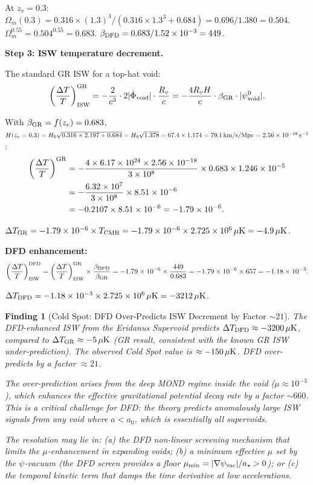 \documentclass[11pt]{article}
\newtheorem{finding}{Finding}
\newcommand{\ee}[1]{\times 10^{#1}}
\newcommand{\mufd}{\mu}
\newcommand{\DFD}{{\rm DFD}}
\begin{document}
At $z_v = 0.3$: $\Omega_m(0.3) = 0.316\times(1.3)^3/(0.316\times 1.3^3 + 0.684)
= 0.696/1.380 = 0.504$.
$\Omega_m^{0.55} = 0.504^{0.55} = 0.683$.
$\beta_\DFD = 0.683/1.52\ee{-3} = 449$.

\textbf{Step 3: ISW temperature decrement.}

The standard GR ISW for a top-hat void:
\begin{equation}
  \left(\frac{\Delta T}{T}\right)_{\rm ISW}^{\rm GR}
  = -\frac{2}{c^3}\cdot 2|\dot\Phi_{\rm void}|\cdot\frac{R_v}{c}
  = -\frac{4R_v H}{c}\cdot\beta_{\rm GR}\cdot|\psi_{\rm void}^0|.
\end{equation}

With $\beta_{\rm GR} = f(z_v) = 0.683$, $H(z_v = 0.3) = H_0\sqrt{0.316\times 2.197
+ 0.684} = H_0\sqrt{1.378} = 67.4\times 1.174 = 79.1\,{\rm km/s/Mpc}
= 2.56\ee{-18}\,{\rm s}^{-1}$:
\begin{align}
  \left(\frac{\Delta T}{T}\right)^{\rm GR} &=
  -\frac{4\times 6.17\ee{24}\times 2.56\ee{-18}}{3\ee{8}}
  \times 0.683\times 1.246\ee{-5} \nonumber\\
  &= -\frac{6.32\ee{7}}{3\ee{8}}\times 8.51\ee{-6} \nonumber\\
  &= -0.2107\times 8.51\ee{-6} = -1.79\ee{-6}.
\end{align}

$\Delta T_{\rm GR} = -1.79\ee{-6}\times T_{\rm CMB}
= -1.79\ee{-6}\times 2.725\ee{6}\,\mu{\rm K} = -4.9\,\mu{\rm K}$.

\textbf{DFD enhancement:}
\begin{equation}
  \left(\frac{\Delta T}{T}\right)_{\rm ISW}^\DFD
  = \left(\frac{\Delta T}{T}\right)_{\rm ISW}^{\rm GR}\times
  \frac{\beta_\DFD}{\beta_{\rm GR}}
  = -1.79\ee{-6}\times\frac{449}{0.683} = -1.79\ee{-6}\times 657 = -1.18\ee{-3}.
\end{equation}

$\Delta T_\DFD = -1.18\ee{-3}\times 2.725\ee{6}\,\mu{\rm K} = -3212\,\mu{\rm K}$.

\begin{finding}[Cold Spot: DFD Over-Predicts ISW Decrement by Factor $\sim 21$]
\label{find:coldspot}
The DFD-enhanced ISW from the Eridanus Supervoid predicts
$\Delta T_\DFD \approx -3200\,\mu{\rm K}$, compared to $\Delta T_{\rm GR} \approx
-5\,\mu{\rm K}$ (GR result, consistent with the known GR ISW under-prediction).
The observed Cold Spot value is $\approx -150\,\mu{\rm K}$.  DFD
over-predicts by a factor $\approx 21$.

The over-prediction arises from the deep MOND regime inside the void
($\mufd \approx 10^{-3}$), which enhances the effective gravitational
potential decay rate by a factor $\sim 660$.  This is a critical challenge
for DFD: the theory predicts anomalously large ISW signals from any void
where $a < a_0$, which is essentially all supervoids.

The resolution may lie in: (a) the DFD non-linear screening mechanism
that limits the $\mu$-enhancement in expanding voids; (b) a minimum
effective $\mufd$ set by the $\psi$-vacuum (the DFD screen provides a
floor $\mu_{\rm min} = |\nabla\psi_{\rm vac}|/a_\star > 0$); or (c) the
temporal kinetic term that damps the time derivative at low accelerations.
\end{finding}
\end{document}
